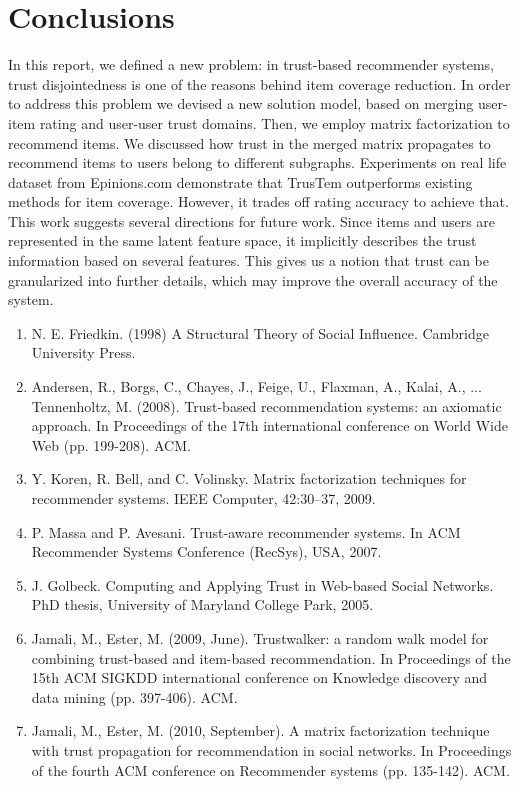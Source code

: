 \documentclass[11pt, conference, onecolumn]{IEEEtran}
\begin{document}
\section{Conclusions}
In this report, we defined a new problem: in trust-based recommender systems, trust disjointedness is one of the reasons behind item coverage reduction. In order to address this problem we devised a new solution model, based on merging user-item rating and user-user trust domains. Then, we employ matrix factorization to recommend items. We discussed how trust in the merged matrix propagates to recommend items to users belong to different subgraphs. 
Experiments on real life dataset from Epinions.com demonstrate that TrusTem outperforms existing methods for item coverage. However, it trades off rating accuracy to achieve that. This work suggests several directions for future work. Since items and users are represented in the same latent feature space, it implicitly describes the trust information based on several features. This gives us a notion that trust can be granularized into further details, which may improve the overall accuracy of the system. 


\begin{enumerate}
\item N. E. Friedkin. (1998) A Structural Theory of Social Influence. Cambridge University Press.
\item Andersen, R., Borgs, C., Chayes, J., Feige, U., Flaxman, A., Kalai, A., ...  Tennenholtz, M. (2008). Trust-based recommendation systems: an axiomatic approach. In Proceedings of the 17th international conference on World Wide Web (pp. 199-208). ACM.
\item Y. Koren, R. Bell, and C. Volinsky. Matrix factorization techniques for recommender systems. IEEE Computer, 42:30–37, 2009.
\item P. Massa and P. Avesani. Trust-aware recommender systems. In ACM Recommender Systems Conference (RecSys), USA, 2007.
\item J. Golbeck. Computing and Applying Trust in Web-based Social Networks. PhD thesis, University of Maryland College Park, 2005.
\item Jamali, M.,  Ester, M. (2009, June). Trustwalker: a random walk model for combining trust-based and item-based recommendation. In Proceedings of the 15th ACM SIGKDD international conference on Knowledge discovery and data mining (pp. 397-406). ACM.
\item Jamali, M.,  Ester, M. (2010, September). A matrix factorization technique with trust propagation for recommendation in social networks. In Proceedings of the fourth ACM conference on Recommender systems (pp. 135-142). ACM.

\end{enumerate}

   
    
\end{document}

